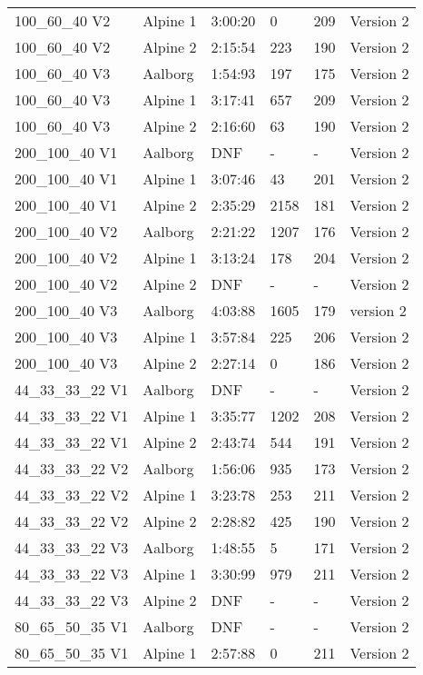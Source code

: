 \begin{table}[H]
\begin{tabular}{llllll}
 100\_60\_40 V2 & Alpine 1 & 3:00:20 & 0 & 209 & Version 2	\\
 100\_60\_40 V2 & Alpine 2 & 2:15:54 & 223 & 190 & Version 2 \\ \hline
 100\_60\_40 V3 & Aalborg & 1:54:93  & 197 & 175 & Version 2   \\ 
 100\_60\_40 V3 & Alpine 1 & 3:17:41  & 657 & 209 & Version 2   \\ 
 100\_60\_40 V3 & Alpine 2 & 2:16:60  & 63 & 190 & Version 2   \\ \hline 
 200\_100\_40 V1 & Aalborg & DNF & - & - & Version 2 \\
 200\_100\_40 V1 & Alpine 1 & 3:07:46 & 43 & 201 & Version 2 \\
 200\_100\_40 V1 & Alpine 2 & 2:35:29 & 2158 & 181 & Version 2 \\ \hline
 200\_100\_40 V2 & Aalborg & 2:21:22 & 1207 & 176 & Version 2 \\
 200\_100\_40 V2 & Alpine 1 & 3:13:24 & 178 & 204 & Version 2 \\
 200\_100\_40 V2 & Alpine 2 & DNF & - & - & Version 2 \\  \hline
 200\_100\_40 V3 & Aalborg & 4:03:88 & 1605 & 179 & version 2 \\
 200\_100\_40 V3 & Alpine 1 & 3:57:84 & 225 & 206 & Version 2 \\
 200\_100\_40 V3 & Alpine 2 & 2:27:14 & 0 & 186 & Version 2 \\ \hline
 44\_33\_33\_22 V1 & Aalborg & DNF & - & - & Version 2 \\
 44\_33\_33\_22 V1 & Alpine 1 & 3:35:77 & 1202 & 208 & Version 2 \\
 44\_33\_33\_22 V1 & Alpine 2 & 2:43:74 & 544 & 191 & Version 2 \\ \hline
 44\_33\_33\_22 V2 & Aalborg & 1:56:06 & 935 & 173 & Version 2 \\
 44\_33\_33\_22 V2 & Alpine 1 & 3:23:78 & 253 & 211 & Version 2 \\
 44\_33\_33\_22 V2 & Alpine 2 & 2:28:82 & 425 & 190 & Version 2 \\ \hline
 44\_33\_33\_22 V3 & Aalborg & 1:48:55 & 5 & 171 & Version 2 \\
 44\_33\_33\_22 V3 & Alpine 1 & 3:30:99 & 979 & 211 & Version 2 \\
 44\_33\_33\_22 V3 & Alpine 2 & DNF & - & - & Version 2 \\ \hline
 80\_65\_50\_35 V1 & Aalborg & DNF & - & - & Version 2 \\
 80\_65\_50\_35 V1 & Alpine 1 & 2:57:88 & 0 & 211 & Version 2 \\

\end{tabular}
\end{table}
